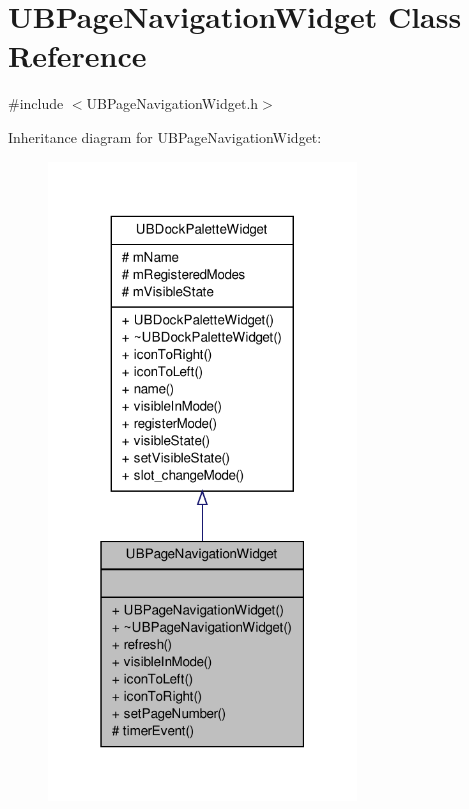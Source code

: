 \hypertarget{class_u_b_page_navigation_widget}{\section{U\-B\-Page\-Navigation\-Widget Class Reference}
\label{d1/def/class_u_b_page_navigation_widget}
}


{\ttfamily \#include $<$U\-B\-Page\-Navigation\-Widget.\-h$>$}



Inheritance diagram for U\-B\-Page\-Navigation\-Widget\-:
\nopagebreak
\begin{figure}[H]
\begin{center}
\leavevmode
\includegraphics[width=232pt]{d3/d5b/class_u_b_page_navigation_widget__inherit__graph}
\end{center}
\end{figure}


